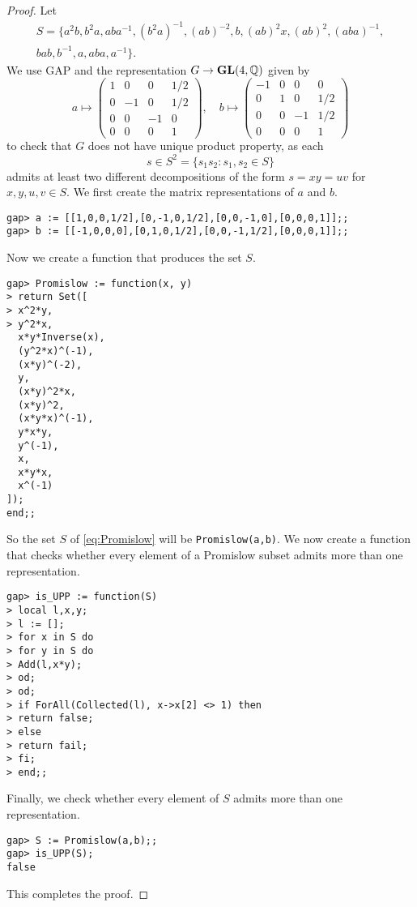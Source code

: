 \begin{proof}
    Let 
    \begin{multline}
    \label{eq:Promislow}
    S=\{ a^2b,
    b^2a,
    aba^{-1},
    (b^2a)^{-1},
    (ab)^{-2},
    b,
    (ab)^2x,
    (ab)^2,
    (aba)^{-1},\\
    bab,
    b^{-1},
    a,
    aba,
    a^{-1}
    \}.
    \end{multline}
    We use \textsf{GAP} and the representation $G\to\mathbf{GL}(4,\mathbb{Q})$ given by 
    \[
a\mapsto\begin{pmatrix}
1 & 0 & 0 & 1/2\\
0 & -1 & 0 & 1/2\\
0 & 0 & -1 & 0\\
0 & 0 & 0 & 1
\end{pmatrix},
\quad
b\mapsto\begin{pmatrix}
-1 & 0 & 0 & 0\\
0 & 1 & 0 & 1/2\\
0 & 0 & -1 & 1/2\\
0 & 0 & 0 & 1
\end{pmatrix}
\]
    to check that 
    $G$ does not have
    unique product property, as each 
    \[
    s\in S^2=\{s_1s_2:s_1,s_2\in S\}
    \]
    admits at least two different decompositions of the 
    form $s=xy=uv$ for $x,y,u,v\in S$. 
    We first create the matrix representations of $a$ and $b$.
\begin{lstlisting}
gap> a := [[1,0,0,1/2],[0,-1,0,1/2],[0,0,-1,0],[0,0,0,1]];;
gap> b := [[-1,0,0,0],[0,1,0,1/2],[0,0,-1,1/2],[0,0,0,1]];;
\end{lstlisting}
    Now we create
    a function that produces the set $S$.
\begin{lstlisting}
gap> Promislow := function(x, y)
> return Set([
> x^2*y,
> y^2*x,
  x*y*Inverse(x),
  (y^2*x)^(-1),
  (x*y)^(-2),
  y,
  (x*y)^2*x,
  (x*y)^2,
  (x*y*x)^(-1),
  y*x*y,
  y^(-1),
  x,
  x*y*x,
  x^(-1)
]);
end;;
\end{lstlisting}
So the set $S$ of \eqref{eq:Promislow} 
will be \lstinline{Promislow(a,b)}. We now
create a function that checks whether
every element of a Promislow subset 
admits more than one representation.
\begin{lstlisting}
gap> is_UPP := function(S)
> local l,x,y;
> l := [];
> for x in S do
> for y in S do
> Add(l,x*y);
> od;
> od;
> if ForAll(Collected(l), x->x[2] <> 1) then
> return false;
> else
> return fail;
> fi;
> end;;
\end{lstlisting}
Finally, we check whether every element of 
$S$ admits more than one representation.
\begin{lstlisting}
gap> S := Promislow(a,b);;
gap> is_UPP(S);
false
\end{lstlisting}
This completes the proof. 
\end{proof}


